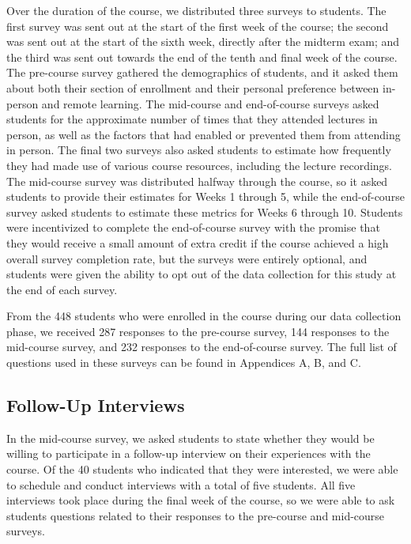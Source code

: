 Over the duration of the course, we distributed three surveys to students. The first survey was sent out at the start of the first week of the course; the second was sent out at the start of the sixth week, directly after the midterm exam; and the third was sent out towards the end of the tenth and final week of the course. The pre-course survey gathered the demographics of students, and it asked them about both their section of enrollment and their personal preference between in-person and remote learning. The mid-course and end-of-course surveys asked students for the approximate number of times that they attended lectures in person, as well as the factors that had enabled or prevented them from attending in person. The final two surveys also asked students to estimate how frequently they had made use of various course resources, including the lecture recordings. The mid-course survey was distributed halfway through the course, so it asked students to provide their estimates for Weeks 1 through 5, while the end-of-course survey asked students to estimate these metrics for Weeks 6 through 10. Students were incentivized to complete the end-of-course survey with the promise that they would receive a small amount of extra credit if the course achieved a high overall survey completion rate, but the surveys were entirely optional, and students were given the ability to opt out of the data collection for this study at the end of each survey.

From the 448 students who were enrolled in the course during our data collection phase, we received 287 responses to the pre-course survey, 144 responses to the mid-course survey, and 232 responses to the end-of-course survey. The full list of questions used in these surveys can be found in Appendices A, B, and C.

\subsection{Follow-Up Interviews}

In the mid-course survey, we asked students to state whether they would be willing to participate in a follow-up interview on their experiences with the course. Of the 40 students who indicated that they were interested, we were able to schedule and conduct interviews with a total of five students. All five interviews took place during the final week of the course, so we were able to ask students questions related to their responses to the pre-course and mid-course surveys.

